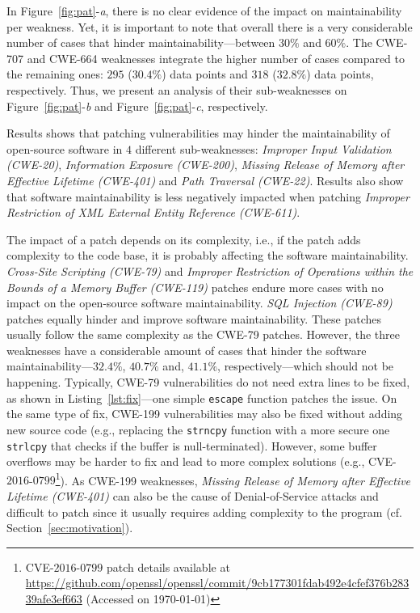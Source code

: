 \documentclass[smallextended]{svjour3}       %
\begin{document}
In Figure~\ref{fig:pat}-\emph{a}, there is no clear evidence of the impact on 
maintainability per weakness. Yet, it is important to note that
overall there is a very considerable number of cases that hinder
maintainability---between $30\%$ and $60\%$. The CWE-707 and CWE-664 
weaknesses integrate the higher number of cases compared to the remaining ones: $295$ ($30.4\%$) data points and $318$ ($32.8\%$) data points, respectively. 
Thus, we present an analysis of their sub-weaknesses on 
Figure~\ref{fig:pat}-\emph{b} and Figure~\ref{fig:pat}-\emph{c}, respectively. 

Results shows that patching vulnerabilities may hinder 
the maintainability of open-source software in $4$ different sub-weaknesses: 
\emph{Improper Input Validation (CWE-20)}, \emph{Information Exposure 
(CWE-200)}, \emph{Missing Release of Memory after Effective 
Lifetime (CWE-401)} and \emph{Path Traversal (CWE-22)}. Results also show that 
software maintainability is less negatively impacted when patching 
\emph{Improper Restriction of XML External Entity Reference (CWE-611)}.  

The impact of a patch depends on its complexity, i.e., if the patch
adds complexity to the code base, it is probably affecting the software
maintainability. \emph{Cross-Site Scripting (CWE-79)} and 
\emph{Improper Restriction of Operations within the Bounds of 
a Memory Buffer (CWE-119)} patches endure more
cases with no impact on the open-source software maintainability. \emph{SQL Injection
(CWE-89)} patches equally hinder and improve software maintainability.
These patches usually follow the same complexity as the CWE-79 patches.
However, the three weaknesses have a considerable amount of cases that hinder
the software maintainability---$32.4\%$, $40.7\%$ and, $41.1\%$, respectively---which
should not be happening. Typically, CWE-79 vulnerabilities do not need extra lines to be fixed, as shown in Listing~\ref{lst:fix}---one simple 
\texttt{escape} function patches the issue. On the same type of fix,
CWE-199 vulnerabilities may also be fixed without adding new source code
(e.g., replacing the \texttt{strncpy} function with a more secure one 
\texttt{strlcpy} that checks if the buffer is null-terminated). However,
some buffer overflows may be harder to fix and lead to more complex 
solutions (e.g., 
CVE-$2016$-$0799$\footnote{CVE-$2016$-$0799$ patch details available at 
\url{https://github.com/openssl/openssl/commit/9cb177301fdab492e4cfef376b28339afe3ef663}
(Accessed on \today{})}). 
As CWE-199 weaknesses, \emph{Missing Release of Memory after Effective 
Lifetime (CWE-401)} can also be the cause of Denial-of-Service attacks and difficult to 
patch since it usually requires adding complexity to the program (cf. Section~\ref{sec:motivation}). 
\end{document}
